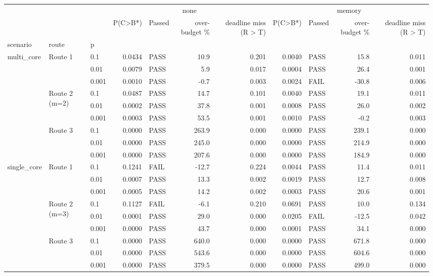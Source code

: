 \begin{tabular}{lllrlrrrlrr}
\toprule
 &  &  & \multicolumn{4}{c}{none} & \multicolumn{4}{c}{memory} \\
 &  &  & P(C>B*) & Passed & over-budget \% & deadline miss (R > T) & P(C>B*) & Passed & over-budget \% & deadline miss (R > T) \\
scenario & route & p &  &  &  &  &  &  &  &  \\
\midrule
\multirow[c]{9}{*}{multi\_core} & \multirow[c]{3}{*}{Route 1} & 0.1 & 0.0434 & PASS & 10.9 & 0.201 & 0.0040 & PASS & 15.8 & 0.011 \\
 &  & 0.01 & 0.0079 & PASS & 5.9 & 0.017 & 0.0004 & PASS & 26.4 & 0.001 \\
 &  & 0.001 & 0.0010 & PASS & -0.7 & 0.003 & 0.0024 & FAIL & -30.8 & 0.006 \\
\cline{2-11}
 & \multirow[c]{3}{*}{Route 2 (m=2)} & 0.1 & 0.0487 & PASS & 14.7 & 0.101 & 0.0040 & PASS & 19.1 & 0.011 \\
 &  & 0.01 & 0.0002 & PASS & 37.8 & 0.001 & 0.0008 & PASS & 26.0 & 0.002 \\
 &  & 0.001 & 0.0003 & PASS & 53.5 & 0.001 & 0.0010 & PASS & -0.2 & 0.003 \\
\cline{2-11}
 & \multirow[c]{3}{*}{Route 3} & 0.1 & 0.0000 & PASS & 263.9 & 0.000 & 0.0000 & PASS & 239.1 & 0.000 \\
 &  & 0.01 & 0.0000 & PASS & 245.0 & 0.000 & 0.0000 & PASS & 214.9 & 0.000 \\
 &  & 0.001 & 0.0000 & PASS & 207.6 & 0.000 & 0.0000 & PASS & 184.9 & 0.000 \\
\cline{1-11} \cline{2-11}
\multirow[c]{9}{*}{single\_core} & \multirow[c]{3}{*}{Route 1} & 0.1 & 0.1241 & FAIL & -12.7 & 0.224 & 0.0044 & PASS & 11.4 & 0.011 \\
 &  & 0.01 & 0.0007 & PASS & 13.3 & 0.002 & 0.0019 & PASS & 12.7 & 0.008 \\
 &  & 0.001 & 0.0005 & PASS & 14.2 & 0.002 & 0.0003 & PASS & 20.6 & 0.001 \\
\cline{2-11}
 & \multirow[c]{3}{*}{Route 2 (m=3)} & 0.1 & 0.1127 & FAIL & -6.1 & 0.210 & 0.0691 & PASS & 10.0 & 0.134 \\
 &  & 0.01 & 0.0001 & PASS & 29.0 & 0.000 & 0.0205 & FAIL & -12.5 & 0.042 \\
 &  & 0.001 & 0.0000 & PASS & 43.7 & 0.000 & 0.0001 & PASS & 34.1 & 0.000 \\
\cline{2-11}
 & \multirow[c]{3}{*}{Route 3} & 0.1 & 0.0000 & PASS & 640.0 & 0.000 & 0.0000 & PASS & 671.8 & 0.000 \\
 &  & 0.01 & 0.0000 & PASS & 543.6 & 0.000 & 0.0000 & PASS & 604.6 & 0.000 \\
 &  & 0.001 & 0.0000 & PASS & 379.5 & 0.000 & 0.0000 & PASS & 499.0 & 0.000 \\
\cline{1-11} \cline{2-11}
\bottomrule
\end{tabular}

